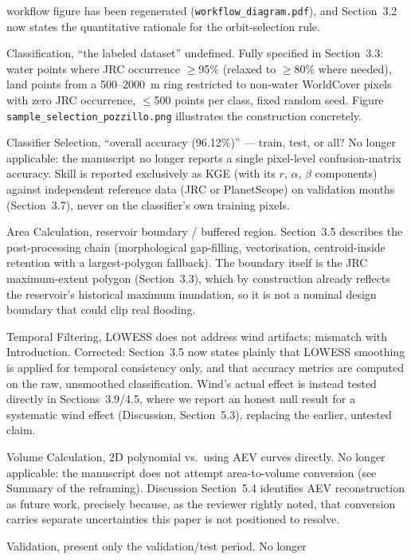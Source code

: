 \documentclass[11pt]{article}
\begin{document}
\begin{resp}
  workflow figure has been regenerated (\texttt{workflow\_diagram.pdf}), and
  Section~3.2 now states the quantitative rationale for the orbit-selection
  rule.
  \item[Classification, ``the labeled dataset'' undefined.] Fully specified
  in Section~3.3: water points where JRC occurrence $\geq$95\% (relaxed to
  $\geq$80\% where needed), land points from a 500--2000~m ring restricted to
  non-water WorldCover pixels with zero JRC occurrence, $\leq$500 points per
  class, fixed random seed. Figure \texttt{sample\_selection\_pozzillo.png}
  illustrates the construction concretely.
  \item[Classifier Selection, ``overall accuracy (96.12\%)'' --- train, test,
  or all?] No longer applicable: the manuscript no longer reports a single
  pixel-level confusion-matrix accuracy. Skill is reported exclusively as KGE
  (with its $r$, $\alpha$, $\beta$ components) against independent reference
  data (JRC or PlanetScope) on validation months (Section~3.7), never on the
  classifier's own training pixels.
  \item[Area Calculation, reservoir boundary / buffered region.] Section~3.5
  describes the post-processing chain (morphological gap-filling,
  vectorisation, centroid-inside retention with a largest-polygon fallback).
  The boundary itself is the JRC maximum-extent polygon (Section~3.3), which
  by construction already reflects the reservoir's historical maximum
  inundation, so it is not a nominal design boundary that could clip real
  flooding.
  \item[Temporal Filtering, LOWESS does not address wind artifacts; mismatch
  with Introduction.] Corrected: Section~3.5 now states plainly that LOWESS
  smoothing is applied for temporal consistency only, and that accuracy
  metrics are computed on the raw, unsmoothed classification. Wind's actual
  effect is instead tested directly in Sections~3.9/4.5, where we report an
  honest null result for a systematic wind effect (Discussion,
  Section~5.3), replacing the earlier, untested claim.
  \item[Volume Calculation, 2D polynomial vs.\ using AEV curves directly.] No
  longer applicable: the manuscript does not attempt area-to-volume
  conversion (see Summary of the reframing). Discussion Section~5.4
  identifies AEV reconstruction as future work, precisely because, as the
  reviewer rightly noted, that conversion carries separate uncertainties this
  paper is not positioned to resolve.
  \item[Validation, present only the validation/test period.] No longer

\end{resp}
\end{document}

